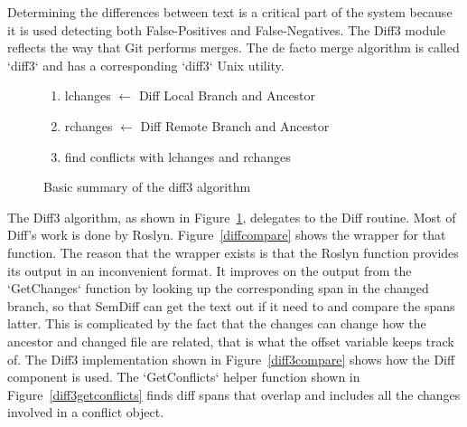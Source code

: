 \documentclass[draftclsnofoot,onecolumn]{IEEEtran}
\begin{document}
Determining the differences between text is a critical part of the system 
because it is used detecting both False-Positives and False-Negatives. The 
Diff3 module reflects the way that Git performs merges. The de facto merge 
algorithm is called `diff3` and has a corresponding `diff3` Unix utility. 

\begin{figure}[!htb]
\centering
\begin{enumerate}
    \item lchanges $\leftarrow$ Diff Local Branch and Ancestor
    \item rchanges $\leftarrow$ Diff Remote Branch and Ancestor
    \item find conflicts with lchanges and rchanges
\end{enumerate}
\caption{Basic summary of the diff3 algorithm}
\label{diff3algorithm}
\end{figure}


The Diff3 algorithm, as shown in Figure~\ref{diff3algorithm}, delegates to 
the Diff routine. Most of Diff’s work is done by Roslyn. 
Figure~\ref{diffcompare} shows the wrapper for that function. The reason that 
the wrapper exists is that the Roslyn function provides its output in an 
inconvenient format. It improves on the output from the `GetChanges` function 
by looking up the corresponding span in the changed branch, so that SemDiff 
can get the text out if it need to and compare the spans latter. This is 
complicated by the fact that the changes can change how the ancestor and 
changed file are related, that is what the offset variable keeps track of. 
The Diff3 implementation shown in Figure~\ref{diff3compare} shows how the 
Diff component is used. The `GetConflicts` helper function shown in 
Figure~\ref{diff3getconflicts} finds diff spans that overlap and includes all 
the changes involved in a conflict object.
\end{document}
